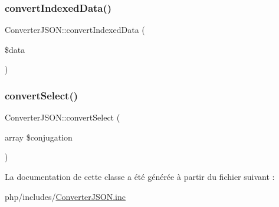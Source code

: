 \hypertarget{class_converter_j_s_o_n_a005d755a0798196fb1ec12e374b695c0}{}\label{class_converter_j_s_o_n_a005d755a0798196fb1ec12e374b695c0} 
\subsubsection{\texorpdfstring{convert\+Indexed\+Data()}{convertIndexedData()}}
{\footnotesize\ttfamily Converter\+J\+S\+O\+N\+::convert\+Indexed\+Data (\begin{DoxyParamCaption}\item[{}]{\$data }\end{DoxyParamCaption})}

\hypertarget{class_converter_j_s_o_n_a62bbae5bb6a9aef4d648eddbe40fa16c}{}\label{class_converter_j_s_o_n_a62bbae5bb6a9aef4d648eddbe40fa16c} 
\subsubsection{\texorpdfstring{convert\+Select()}{convertSelect()}}
{\footnotesize\ttfamily Converter\+J\+S\+O\+N\+::convert\+Select (\begin{DoxyParamCaption}\item[{array}]{\$conjugation }\end{DoxyParamCaption})}



La documentation de cette classe a été générée à partir du fichier suivant \+:\begin{DoxyCompactItemize}
\item 
php/includes/\hyperlink{_converter_j_s_o_n_8inc}{Converter\+J\+S\+O\+N.\+inc}\end{DoxyCompactItemize}
